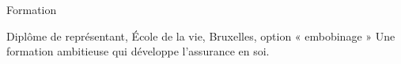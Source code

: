 \begin{rubric}{Formation}

\entry*[1955 -- 1958] Diplôme de représentant, École de la
                      vie, Bruxelles, option « embobinage »
\entry*               Une formation ambitieuse qui développe
                      l'assurance en soi.

\end{rubric}
